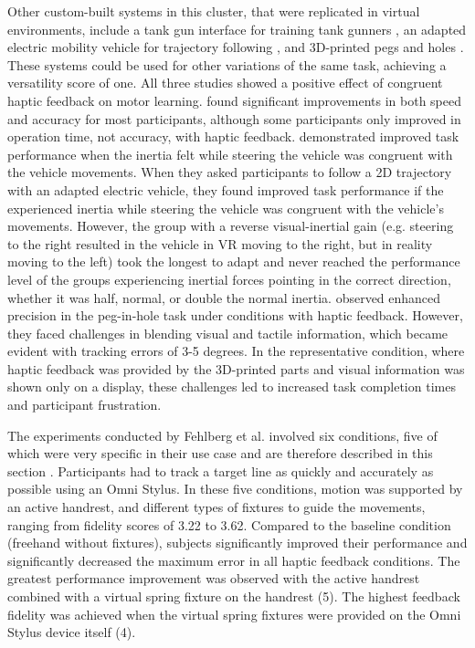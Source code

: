 Other custom-built systems in this cluster, that were replicated in virtual environments, include a tank gun interface for training tank gunners \cite{LiuG2014}, an adapted electric mobility vehicle for trajectory following \cite{Macuga2019}, and 3D-printed pegs and holes \cite{Mohanty2023}.
These systems could be used for other variations of the same task, achieving a versatility score of one. All three studies showed a positive effect of congruent haptic feedback on motor learning. 
\cite{LiuG2014} found significant improvements in both speed and accuracy for most participants, although some participants only improved in operation time, not accuracy, with haptic feedback. \cite{Macuga2019} demonstrated improved task performance when the inertia felt while steering the vehicle was congruent with the vehicle movements. When they asked participants to follow a 2D trajectory with an adapted electric vehicle, they found improved task performance if the experienced inertia while steering the vehicle was congruent with the vehicle's movements. However, the group with a reverse visual-inertial gain (e.g. steering to the right resulted in the vehicle in VR moving to the right, but in reality moving to the left) took the longest to adapt and never reached the performance level of the groups experiencing inertial forces pointing in the correct direction, whether it was half, normal, or double the normal inertia. 
\cite{Mohanty2023} observed enhanced precision in the peg-in-hole task under conditions with haptic feedback. However, they faced challenges in blending visual and tactile information, which became evident with tracking errors of 3-5 degrees. In the representative condition, where haptic feedback was provided by the 3D-printed parts and visual information was shown only on a display, these challenges led to increased task completion times and participant frustration.

The experiments conducted by Fehlberg et al. involved six conditions, five of which were very specific in their use case and are therefore described in this section \cite{Fehlberg2012}. Participants had to track a target line as quickly and accurately as possible using an Omni Stylus. In these five conditions, motion was supported by an active handrest, and different types of fixtures to guide the movements, ranging from fidelity scores of 3.22 to 3.62.
Compared to the baseline condition (freehand without fixtures), subjects significantly improved their performance and significantly decreased the maximum error in all haptic feedback conditions. The greatest performance improvement was observed with the active handrest combined with a virtual spring fixture on the handrest (5). The highest feedback fidelity was achieved when the virtual spring fixtures were provided on the Omni Stylus device itself (4). 

